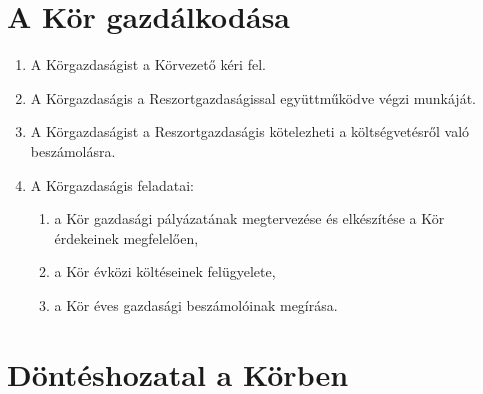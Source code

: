 \documentclass[12pt]{article}
\begin{document}

\section{A Kör gazdálkodása}

\begin{enumerate}
\item A Körgazdaságist a Körvezető kéri fel.
\item A Körgazdaságis a Reszortgazdaságissal együttműködve végzi munkáját.
\item A Körgazdaságist a Reszortgazdaságis kötelezheti a költségvetésről való beszámolásra.
\item A Körgazdaságis feladatai:
\begin{enumerate}
  \item a Kör gazdasági pályázatának megtervezése és elkészítése a Kör érdekeinek megfelelően,
  \item a Kör évközi költéseinek felügyelete,
  \item a Kör éves gazdasági beszámolóinak megírása.
\end{enumerate}
\end{enumerate}


\section{Döntéshozatal a Körben}
\end{document}

